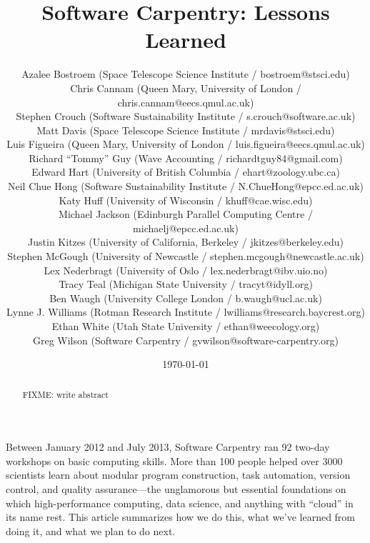 \documentclass{article}
\begin{document}
\title{Software Carpentry: Lessons Learned}
\date{\today}

\author{
  Azalee Bostroem (Space Telescope Science Institute / bostroem@stsci.edu)\\
  Chris Cannam (Queen Mary, University of London / chris.cannam@eecs.qmul.ac.uk)\\
  Stephen Crouch (Software Sustainability Institute / s.crouch@software.ac.uk)\\
  Matt Davis (Space Telescope Science Institute / mrdavis@stsci.edu)\\
  Luis Figueira (Queen Mary, University of London / luis.figueira@eecs.qmul.ac.uk)\\
  Richard ``Tommy'' Guy (Wave Accounting / richardtguy84@gmail.com)\\
  Edward Hart (University of British Columbia / ehart@zoology.ubc.ca)\\
  Neil Chue Hong (Software Sustainability Institute / N.ChueHong@epcc.ed.ac.uk)\\
  Katy Huff (University of  Wisconsin / khuff@cae.wisc.edu)\\
  Michael Jackson (Edinburgh Parallel Computing Centre / michaelj@epcc.ed.ac.uk)\\
  Justin Kitzes (University of California, Berkeley / jkitzes@berkeley.edu)\\
  Stephen McGough (University of Newcastle / stephen.mcgough@newcastle.ac.uk) \\
  Lex Nederbragt (University of Oslo / lex.nederbragt@ibv.uio.no)\\
  Tracy Teal (Michigan State University / tracyt@idyll.org)\\
  Ben Waugh (University College London / b.waugh@ucl.ac.uk)\\
  Lynne J. Williams (Rotman Research Institute / lwilliams@research.baycrest.org)\\
  Ethan White (Utah State University / ethan@weecology.org)\\
  Greg Wilson (Software Carpentry / gvwilson@software-carpentry.org)
}

\maketitle

\begin{abstract}
FIXME: write abstract
\end{abstract}

Between January 2012 and July 2013,
Software Carpentry ran 92 two-day workshops on basic computing skills.
More than 100 people helped over 3000 scientists learn about
modular program construction,
task automation,
version control,
and quality assurance---the unglamorous but essential foundations
on which high-performance computing,
data science,
and anything with ``cloud'' in its name rest.
This article summarizes how we do this,
what we've learned from doing it,
and what we plan to do next.
\end{document}
